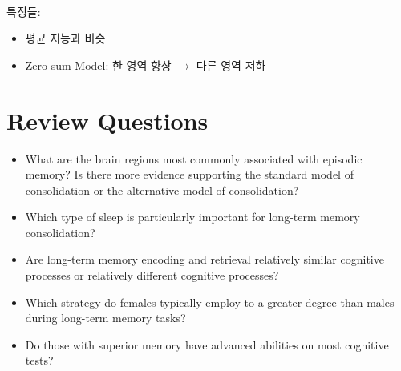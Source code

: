 \documentclass[../note.tex]{subfiles}
\begin{document}
\\

\vspace{1em}
특징들:
\begin{itemize}
  \item 평균 지능과 비슷
  \item Zero-sum Model: 한 영역 향상 $\rightarrow$ 다른 영역 저하
\end{itemize}

\section{Review Questions}
\begin{itemize}
  \item What are the brain regions most commonly associated with episodic
memory?
  \itme Is there more evidence supporting the standard model of consolidation or
the alternative model of consolidation?
  \item Which type of sleep is particularly important for long-term memory
consolidation?
  \item Are long-term memory encoding and retrieval relatively similar
cognitive processes or relatively different cognitive processes?
  \item Which strategy do females typically employ to a greater degree than
males during long-term memory tasks?
  \item Do those with superior memory have advanced abilities on most
cognitive tests?
\end{itemize}
\end{document}
